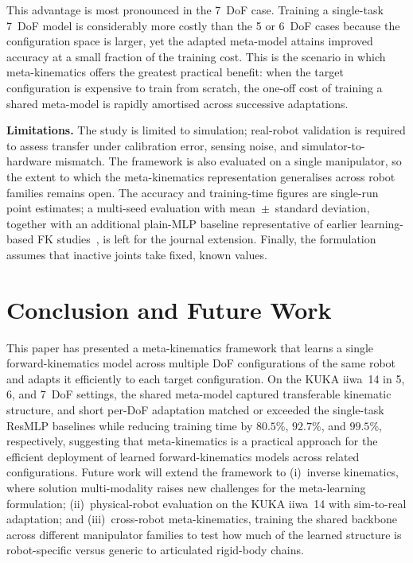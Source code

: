 \documentclass[conference]{IEEEtran}
\begin{document}
This advantage is most pronounced in the 7~DoF case. Training a single-task 7~DoF model is considerably more costly than the 5 or 6~DoF cases because the configuration space is larger, yet the adapted meta-model attains improved accuracy at a small fraction of the training cost. This is the scenario in which meta-kinematics offers the greatest practical benefit: when the target configuration is expensive to train from scratch, the one-off cost of training a shared meta-model is rapidly amortised across successive adaptations.

\textbf{Limitations.}
The study is limited to simulation; real-robot validation is required to assess transfer under calibration error, sensing noise, and simulator-to-hardware mismatch. The framework is also evaluated on a single manipulator, so the extent to which the meta-kinematics representation generalises across robot families remains open. The accuracy and training-time figures are single-run point estimates; a multi-seed evaluation with mean~$\pm$~standard deviation, together with an additional plain-MLP baseline representative of earlier learning-based FK studies~\cite{duka2014,koker2004}, is left for the journal extension. Finally, the formulation assumes that inactive joints take fixed, known values.

\section{Conclusion and Future Work}
\label{sec:conclusion}

This paper has presented a meta-kinematics framework that learns a single forward-kinematics model across multiple DoF configurations of the same robot and adapts it efficiently to each target configuration. On the KUKA iiwa~14 in 5, 6, and 7~DoF settings, the shared meta-model captured transferable kinematic structure, and short per-DoF adaptation matched or exceeded the single-task ResMLP baselines while reducing training time by $80.5\%$, $92.7\%$, and $99.5\%$, respectively, suggesting that meta-kinematics is a practical approach for the efficient deployment of learned forward-kinematics models across related configurations. Future work will extend the framework to (i)~inverse kinematics, where solution multi-modality raises new challenges for the meta-learning formulation; (ii)~physical-robot evaluation on the KUKA iiwa~14 with sim-to-real adaptation; and (iii)~cross-robot meta-kinematics, training the shared backbone across different manipulator families to test how much of the learned structure is robot-specific versus generic to articulated rigid-body chains.
\end{document}
